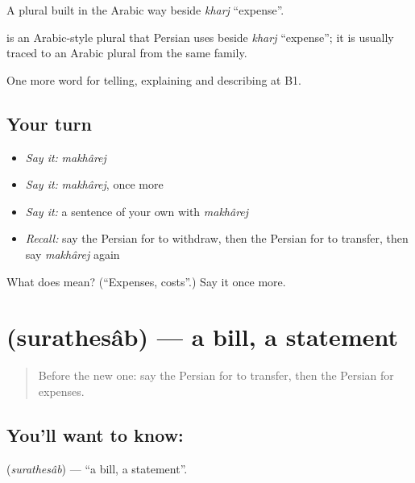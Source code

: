 A plural built in the Arabic way beside \emph{kharj} \textquotedblleft{}expense\textquotedblright{}.

\begin{cousinweb}
\textbf{} is an Arabic-style plural that Persian uses beside \emph{kharj} \textquotedblleft{}expense\textquotedblright{}; it is usually traced to an Arabic plural from the same family.
\end{cousinweb}

\begin{grammarlens}[title={What you've built}]
One more word for telling, explaining and describing at B1.
\end{grammarlens}

\subsection*{Your turn}
\begin{itemize}
\raggedright
  \item \emph{Say it:} \emph{makhârej}
  \item \emph{Say it:} \emph{makhârej}, once more
  \item \emph{Say it:} a sentence of your own with \emph{makhârej}
  \item \emph{Recall:} say the Persian for to withdraw, then the Persian for to transfer, then say \emph{makhârej} again
\end{itemize}

\begin{tcolorbox}[breakable,colback=teal!4,colframe=teal!35!black,title={Before you move on}]
What does  mean? (\textquotedblleft{}Expenses, costs\textquotedblright{}.) Say it once more.
\end{tcolorbox}
\section[\texorpdfstring{\fa{صورتحساب} (surathesâb)}{صورتحساب (surathesâb)}]{ (surathesâb) — a bill, a statement}

\label{lesson:FA-C415-surathesab}



\begin{quote}
Before the new one: say the Persian for to transfer, then the Persian for expenses.
\end{quote}

\subsection*{You'll want to know: }
\textbf{} (\emph{surathesâb}) — \textquotedblleft{}a bill, a statement\textquotedblright{}.

